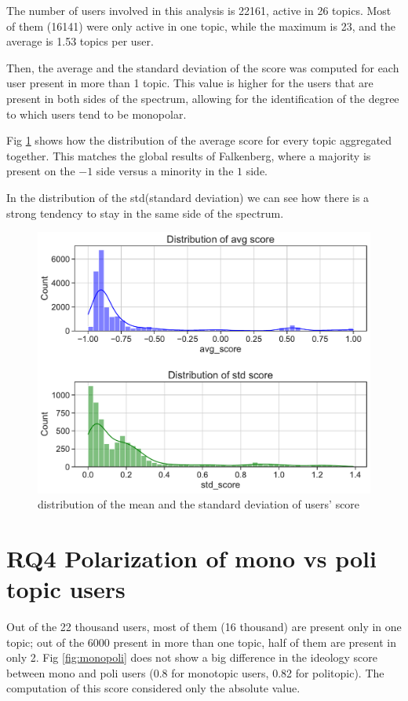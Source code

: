 The number of users involved in this analysis is 22161, active in 26 topics. Most of them (16141) were only active in one topic, while the maximum is 23, and the average is 1.53 topics per user.

Then, the average and the standard deviation of the score was computed for each user present in more than 1 topic. This value is higher for the users that are present in both sides of the spectrum, allowing for the identification of the degree to which users tend to be monopolar.


Fig \ref{fig:std_avg} shows how the distribution of the average score for every topic aggregated together.
 This matches the global results of Falkenberg, where a majority is present on the $−1$ side versus a minority in the $1$ side.


In the distribution of the std(standard deviation) we can see how there is a strong tendency to stay in the same side of the spectrum.

\begin{figure}[H]
    \centering
    \includegraphics[width=0.9\linewidth]{Chapter5/figures/avg_std_score.pdf}
    
    \caption{distribution of the mean and the standard deviation of users' score}
    \label{fig:std_avg}
\end{figure}



\section{RQ4 Polarization of mono vs poli topic users }
Out of the 22 thousand users, most of them (16 thousand) are present only in one topic; out of the 6000 present in more than one topic, half of them are present in only 2. Fig \ref{fig:monopoli} does not show a big difference in the ideology score between mono and poli users (0.8 for monotopic users, 0.82 for politopic). The computation of this score considered only the absolute value.


